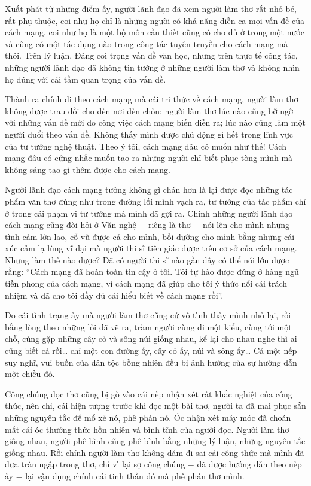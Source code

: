 \documentclass[../main.tex]{subfiles}
\begin{document}
\begin{multicols}{2}
Xuất phát từ những điểm ấy, người lãnh đạo đã xem người làm thơ rất nhỏ bé, rất phụ thuộc, coi như họ chỉ là những người có khả năng diễn ca mọi vấn đề của cách mạng, coi như họ là một bộ môn cần thiết cũng có cho đủ ở trong một nước và cũng có một tác dụng nào trong công tác tuyên truyền cho cách mạng mà thôi. Trên lý luận, Đảng coi trọng vấn đề văn học, nhưng trên thực tế công tác, những người lãnh đạo đã không tin tưởng ở những người làm thơ và không nhìn họ đúng với cái tầm quan trọng của vấn đề. 
 
Thành ra chính đi theo cách mạng mà cái tri thức về cách mạng, người làm thơ không được trau dồi cho đến nơi đến chốn; người làm thơ lúc nào cũng bỡ ngỡ với những vấn đề mới do công việc cách mạng biến diễn ra; lúc nào cũng làm một người đuổi theo vấn đề. Không thấy mình được chủ động gì hết trong lĩnh vực của tư tưởng nghệ thuật. Theo ý tôi, cách mạng đâu có muốn như thế! Cách mạng đâu có cứng nhắc muốn tạo ra những người chỉ biết phục tòng mình mà  không sáng tạo gì thêm được cho cách mạng. 
 
Người lãnh đạo cách mạng tưởng không gì chán hơn là lại được đọc những tác phẩm văn thơ đúng như trong đường lối mình vạch ra, tư tưởng của tác phẩm chỉ ở trong cái phạm vi tư tưởng mà mình đã gợi ra. Chính những người lãnh đạo cách mạng cũng đòi hỏi ở Văn nghệ − riêng là thơ − nói lên cho mình những tình cảm lớn lao, cổ vũ được cả cho mình, bồi dưỡng cho mình bằng những cái xúc cảm lạ lùng vĩ đại mà người thi sĩ tiên giác được trên cơ sở của cách mạng. Nhưng làm thế nào được? Đã có người thi sĩ nào gần đây có thể nói lớn được rằng: “Cách mạng đã hoàn toàn tin cậy ở tôi. Tôi tự hào được đứng ở hàng ngũ tiền phong của cách mạng, vì cách mạng đã giúp cho tôi ý thức nổi cái trách nhiệm và đã cho tôi đầy đủ cái hiểu biết về cách mạng rồi”.    
 
Do cái tình trạng ấy mà người làm thơ cũng cứ vô tình thấy mình nhỏ lại, rồi bằng lòng theo những lối đã vẽ ra, trăm người cùng đi một kiểu, cùng tới một chỗ, cùng gặp những cây cỏ và sông núi giống nhau, kể lại cho nhau nghe thì ai cũng biết cả rồi… chỉ một con đường ấy, cây cỏ ấy, núi và sông ấy… Cả một nếp suy nghĩ, vui buồn của dân tộc bỗng nhiên đều bị ảnh hưởng của sự hướng dẫn một chiều đó. 
 
Công chúng đọc thơ cũng bị gò vào cái nếp nhận xét rất khắc nghiệt của công thức, nên chi, cái hiện tượng trước khi đọc một bài thơ, người ta đã mai phục sẵn những nguyên tắc để mổ xẻ nó, phê phán nó. Óc nhận xét máy móc đã choán mất cái óc thưởng thức hồn nhiên và bình tĩnh của người đọc. Người làm thơ giống nhau, người phê bình cũng phê bình bằng những lý luận, những nguyên tắc giống nhau. Rồi chính người làm thơ không dám đi sai cái công thức mà mình đã đưa tràn ngập trong thơ, chỉ vì lại sợ công chúng − đã được hướng dẫn theo nếp ấy − lại vận dụng chính cái tinh thần đó mà phê phán thơ mình.  
 

\end{multicols}
\end{document}
